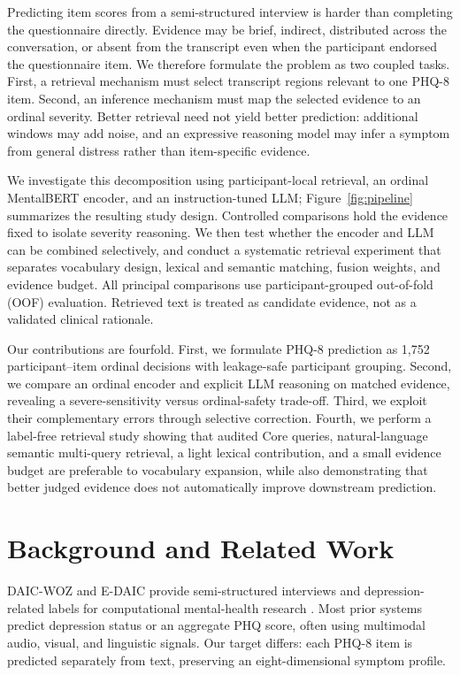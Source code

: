 \documentclass{article}
\begin{document}
Predicting item scores from a semi-structured interview is harder than completing the questionnaire directly. Evidence may be brief, indirect, distributed across the conversation, or absent from the transcript even when the participant endorsed the questionnaire item. We therefore formulate the problem as two coupled tasks. First, a retrieval mechanism must select transcript regions relevant to one PHQ-8 item. Second, an inference mechanism must map the selected evidence to an ordinal severity. Better retrieval need not yield better prediction: additional windows may add noise, and an expressive reasoning model may infer a symptom from general distress rather than item-specific evidence.

We investigate this decomposition using participant-local retrieval, an ordinal MentalBERT encoder, and an instruction-tuned LLM; Figure~\ref{fig:pipeline} summarizes the resulting study design. Controlled comparisons hold the evidence fixed to isolate severity reasoning. We then test whether the encoder and LLM can be combined selectively, and conduct a systematic retrieval experiment that separates vocabulary design, lexical and semantic matching, fusion weights, and evidence budget. All principal comparisons use participant-grouped out-of-fold (OOF) evaluation. Retrieved text is treated as candidate evidence, not as a validated clinical rationale.

Our contributions are fourfold. First, we formulate PHQ-8 prediction as 1,752 participant--item ordinal decisions with leakage-safe participant grouping. Second, we compare an ordinal encoder and explicit LLM reasoning on matched evidence, revealing a severe-sensitivity versus ordinal-safety trade-off. Third, we exploit their complementary errors through selective correction. Fourth, we perform a label-free retrieval study showing that audited Core queries, natural-language semantic multi-query retrieval, a light lexical contribution, and a small evidence budget are preferable to vocabulary expansion, while also demonstrating that better judged evidence does not automatically improve downstream prediction.

\section{Background and Related Work}
\label{sec:background}
DAIC-WOZ and E-DAIC provide semi-structured interviews and depression-related labels for computational mental-health research \cite{gratch2014daic,devault2014simsensei,ringeval2019avec}. Most prior systems predict depression status or an aggregate PHQ score, often using multimodal audio, visual, and linguistic signals. Our target differs: each PHQ-8 item is predicted separately from text, preserving an eight-dimensional symptom profile.
\end{document}
